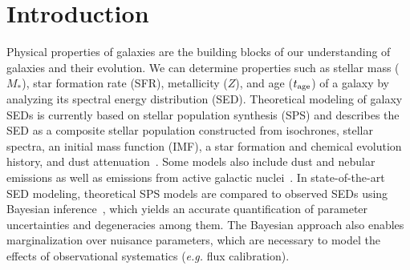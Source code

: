 \section{Introduction} \label{sec:intro} 
Physical properties of galaxies are the building
blocks of our understanding of galaxies and their evolution. 
We can determine properties such as stellar mass ($M_*$), star formation rate (SFR), metallicity
($Z$), and age ($t_{\rm age}$) of a galaxy by analyzing its
spectral energy distribution (SED).
Theoretical modeling of galaxy SEDs is currently based on stellar population
synthesis (SPS) and describes the SED as a composite stellar population constructed
from isochrones, stellar spectra, an initial mass function (IMF), a star
formation and chemical evolution history, and dust
attenuation~\citep[\emph{e.g.}][see \citealt{walcher2011, conroy2013} for a
comprehensive review]{bruzual2003, maraston2005, conroy2009}.
Some models also include dust and nebular emissions as well as emissions from
active galactic nuclei~\citep[\emph{e.g.}][]{johnson2021}.
In state-of-the-art SED modeling, theoretical SPS models are compared to
observed SEDs using Bayesian inference~\citep{acquaviva2011, chevallard2016,
leja2017, carnall2018, johnson2021, hahn2022}, which yields 
an accurate quantification of parameter uncertainties and degeneracies among them. 
The Bayesian approach also enables marginalization over nuisance parameters,
which are necessary to model the effects of observational systematics
(\emph{e.g.} flux calibration).


